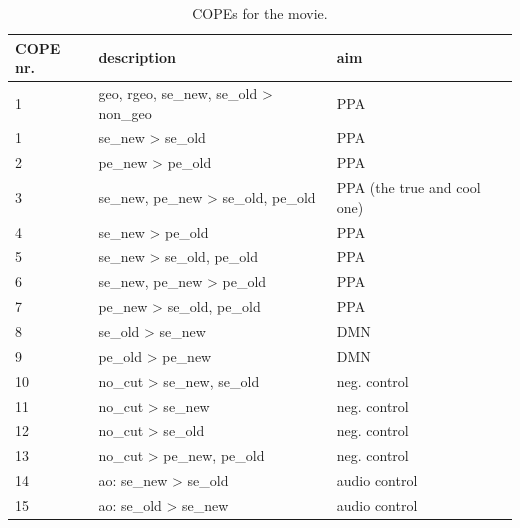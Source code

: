 \documentclass[english]{article}
\begin{document}
\begin{table}
\caption{COPEs for the movie.}
\begin{tabular}{lll}
\toprule
\textbf{COPE nr. } & \textbf{description} & \textbf{aim} \\
\midrule
1 & geo, rgeo, se\_new, se\_old > non\_geo & PPA \\
1 & se\_new > se\_old & PPA \\
2 & pe\_new > pe\_old & PPA \\
3 & se\_new, pe\_new > se\_old, pe\_old & PPA (the true and cool one) \\
4 & se\_new > pe\_old & PPA \\
5 & se\_new > se\_old, pe\_old & PPA \\
6 & se\_new, pe\_new > pe\_old & PPA \\
7 & pe\_new > se\_old, pe\_old & PPA \\
8 & se\_old > se\_new & DMN \\
9 & pe\_old > pe\_new & DMN \\
10 & no\_cut > se\_new, se\_old & neg. control \\
11 & no\_cut > se\_new & neg. control \\
12 & no\_cut > se\_old & neg. control \\
13 & no\_cut > pe\_new, pe\_old & neg. control \\
14 & ao: se\_new > se\_old & audio control \\
15 & ao: se\_old > se\_new & audio control \\
\bottomrule
\end{tabular}
\end{table}
\end{document}
